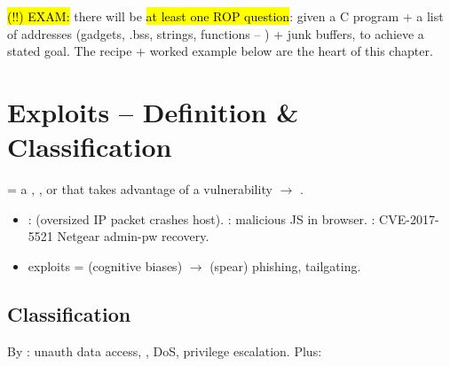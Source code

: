 

\begin{defbox}
\hl{(!!) EXAM:} there will be \hl{at least one ROP question}: given a C program + a list of addresses (gadgets, .bss, strings, functions -- ) + junk buffers,  to achieve a stated goal. The recipe + worked example below are the heart of this chapter.
\end{defbox}

\section{Exploits -- Definition \& Classification}
 = a , , or  that takes advantage of a vulnerability $\to$ .
\begin{itemize}
\item {}:  (oversized IP packet crashes host). : malicious JS in browser. : CVE-2017-5521 Netgear admin-pw recovery.
\item {} exploits =  (cognitive biases) $\to$ (spear) phishing, tailgating.
\end{itemize}
\subsection{Classification}
By : unauth data access, , DoS, privilege escalation. 
Plus:

